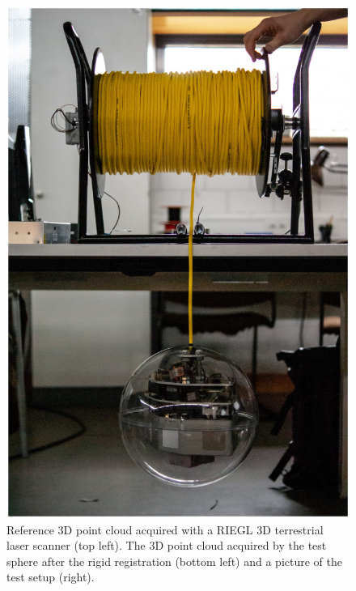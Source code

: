 \begin{figure}
\begin{minipage}[c]{0.2075\textwidth}
  		\includegraphics[width=\textwidth]{./images/lidarsetup}
  	\end{minipage}
	\caption{Reference 3D point cloud acquired with a RIEGL 3D terrestrial laser scanner (top left). The 3D point cloud acquired by the test sphere after the rigid registration (bottom left) and a picture of the test setup (right).}
	\label{fig:experimental-setup}
\end{figure}




